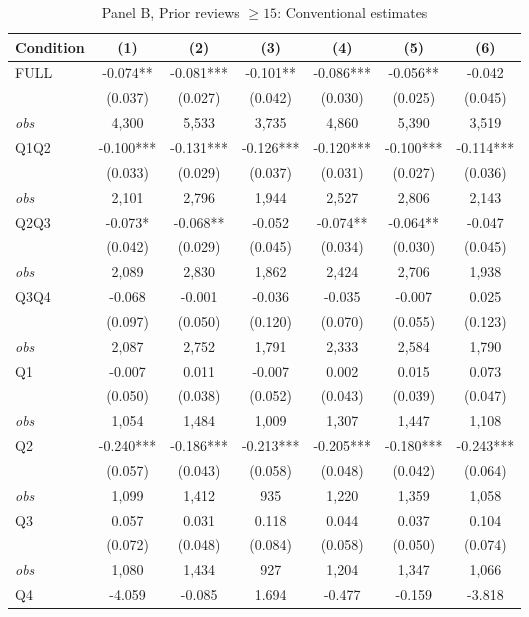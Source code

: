 \documentclass[11pt]{article}
\begin{document}
\begin{table}[!htbp]
\centering
\caption{Panel B, Prior reviews $\geq 15$: Conventional estimates}
\label{tab:trim00:b:prior_reviews_ge15}
\small
\begin{tabular}{lcccccc}
\toprule
Condition & (1) & (2) & (3) & (4) & (5) & (6) \\
\midrule
FULL & -0.074** & -0.081*** & -0.101** & -0.086*** & -0.056** & -0.042 \\
 & (0.037) & (0.027) & (0.042) & (0.030) & (0.025) & (0.045) \\
\textit{obs} & 4,300 & 5,533 & 3,735 & 4,860 & 5,390 & 3,519 \\
Q1Q2 & -0.100*** & -0.131*** & -0.126*** & -0.120*** & -0.100*** & -0.114*** \\
 & (0.033) & (0.029) & (0.037) & (0.031) & (0.027) & (0.036) \\
\textit{obs} & 2,101 & 2,796 & 1,944 & 2,527 & 2,806 & 2,143 \\
Q2Q3 & -0.073* & -0.068** & -0.052 & -0.074** & -0.064** & -0.047 \\
 & (0.042) & (0.029) & (0.045) & (0.034) & (0.030) & (0.045) \\
\textit{obs} & 2,089 & 2,830 & 1,862 & 2,424 & 2,706 & 1,938 \\
Q3Q4 & -0.068 & -0.001 & -0.036 & -0.035 & -0.007 & 0.025 \\
 & (0.097) & (0.050) & (0.120) & (0.070) & (0.055) & (0.123) \\
\textit{obs} & 2,087 & 2,752 & 1,791 & 2,333 & 2,584 & 1,790 \\
Q1 & -0.007 & 0.011 & -0.007 & 0.002 & 0.015 & 0.073 \\
 & (0.050) & (0.038) & (0.052) & (0.043) & (0.039) & (0.047) \\
\textit{obs} & 1,054 & 1,484 & 1,009 & 1,307 & 1,447 & 1,108 \\
Q2 & -0.240*** & -0.186*** & -0.213*** & -0.205*** & -0.180*** & -0.243*** \\
 & (0.057) & (0.043) & (0.058) & (0.048) & (0.042) & (0.064) \\
\textit{obs} & 1,099 & 1,412 &   935 & 1,220 & 1,359 & 1,058 \\
Q3 & 0.057 & 0.031 & 0.118 & 0.044 & 0.037 & 0.104 \\
 & (0.072) & (0.048) & (0.084) & (0.058) & (0.050) & (0.074) \\
\textit{obs} & 1,080 & 1,434 &   927 & 1,204 & 1,347 & 1,066 \\
Q4 & -4.059 & -0.085 & 1.694 & -0.477 & -0.159 & -3.818 \\

\end{tabular}
\end{table}
\end{document}
